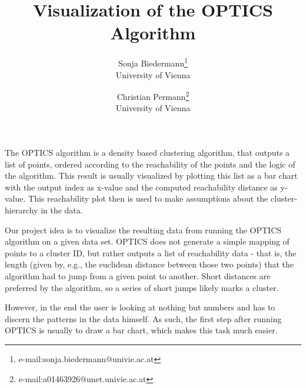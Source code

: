\documentclass{vgtc}                          %
\title{Visualization of the OPTICS Algorithm}
\author{Sonja Biedermann\thanks{e-mail:sonja.biedermann@univie.ac.at }\\ %
        \scriptsize University of Vienna %
\and Christian Permann\thanks{e-mail:a01463926@unet.univie.ac.at}\\ %
     \scriptsize  University of Vienna}
\begin{document}


\maketitle


\begin{flushleft}
The OPTICS algorithm is a density based clustering algorithm, that outputs a list of points,
 ordered according to the reachability of the points and the logic of the algorithm. 
This result is usually visualized by plotting this list as a bar chart with the output index as x-value and the 
computed reachability distance as y-value. This reachability plot then is used to make assumptions about 
the cluster-hierarchy in the data. 
\end{flushleft}

\begin{flushleft}
Our project idea is to visualize the resulting data from running the OPTICS algorithm on a given data set. OPTICS does not generate a simple mapping of points to a cluster ID, but rather outputs a list of reachability data - that is, the length (given by, e.g., the euclidean distance between those two points) that the algorithm had to jump from a given point to another. Short distances are preferred by the algorithm, so a series of short jumps likely marks a cluster.
\end{flushleft}

\begin{flushleft}
However, in the end the user is looking at nothing but numbers and has to discern the patterns in the data himself. As such, the first step after running OPTICS is usually to draw a bar chart, which makes this task much easier.
\end{flushleft}
\end{document}

